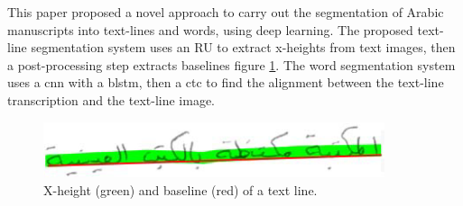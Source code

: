 This paper \cite{8892920} proposed a novel approach to carry out the segmentation of Arabic manuscripts into text-lines and words, using deep learning. The proposed text-line segmentation system uses an \acrshort{RU} to extract x-heights from text images, then a post-processing step extracts baselines figure \ref{fig:X-height}. The word segmentation system uses a \acrshort{cnn} with a \acrshort{blstm}, then a \acrshort{ctc} to find the alignment between the text-line transcription and the text-line image.

\begin{figure}[!htb]
    \centering
    \includegraphics[width=10cm]{images/X-height.png}
    \caption{X-height (green) and baseline (red) of a text line.}
    \label{fig:X-height}
\end{figure}


